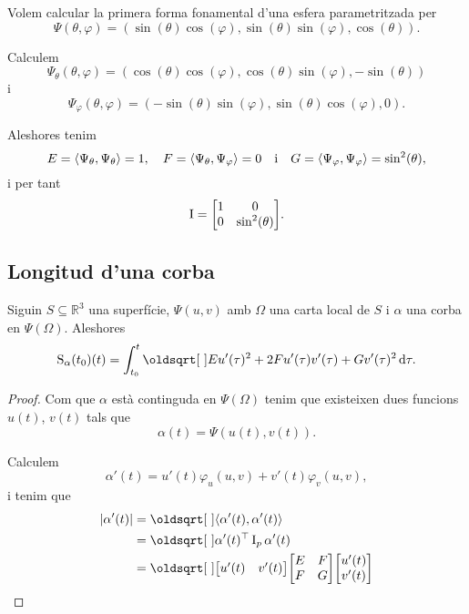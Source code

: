 \documentclass[../Apunts.tex]{subfiles}
\begin{document}
	\begin{example}
		\label{ex:primera forma fonamental d'una esfera de radi 1}
		Volem calcular la primera forma fonamental d'una esfera parametritzada per
		\[\Psi(\theta,\varphi)=(\sin(\theta)\cos(\varphi),\sin(\theta)\sin(\varphi),\cos(\theta)).\]
	\end{example}
	\begin{solution}
		Calculem
		\[\Psi_{\theta}(\theta,\varphi)=(\cos(\theta)\cos(\varphi),\cos(\theta)\sin(\varphi),-\sin(\theta))\]
		i
		\[\Psi_{\varphi}(\theta,\varphi)=(-\sin(\theta)\sin(\varphi),\sin(\theta)\cos(\varphi),0).\]
		
		Aleshores tenim
		\[E=\prodesc{\Psi_{\theta}}{\Psi_{\theta}}=1,\quad F=\prodesc{\Psi_{\theta}}{\Psi_{\varphi}}=0\quad\text{i}\quad G=\prodesc{\Psi_{\varphi}}{\Psi_{\varphi}}=\sin^{2}(\theta),\]
		i per tant
		\[\I=\begin{bmatrix}
			1 & 0 \\
			0 & \sin^{2}(\theta)
		\end{bmatrix}.\qedhere\]
	\end{solution}
	\subsection{Longitud d'una corba}
	\begin{proposition}
		\label{prop:longitud d'una corba en una superfície}
		Siguin \(S\subseteq\mathbb{R}^{3}\) una superfície, \(\Psi(u,v)\) amb \(\Omega\) una carta local de \(S\) i \(\alpha\) una corba en \(\Psi(\Omega)\). Aleshores
		\[\funciolongituddarc_{\alpha}(t_{0})(t)=\int_{t_{0}}^{t}\sqrt{Eu'(\tau)^{2}+2Fu'(\tau)v'(\tau)+Gv'(\tau)^{2}}\diff \tau.\]
	\end{proposition}
	\begin{proof}
		Com que \(\alpha\) està continguda en \(\Psi(\Omega)\) tenim que existeixen dues funcions \(u(t)\), \(v(t)\) tals que
		\[\alpha(t)=\Psi(u(t),v(t)).\]
		
		Calculem
		\[\alpha'(t)=u'(t)\varphi_{u}(u,v)+v'(t)\varphi_{v}(u,v),\]
		i tenim que
		\begin{align*}
			\norm{\alpha'(t)}&=\sqrt{\prodesc{\alpha'(t)}{\alpha'(t)}} \\
			&=\sqrt{\alpha'(t)^{\transposta}\I_{p}\alpha'(t)} \\
			&=\sqrt{\begin{bmatrix}
				u'(t) & v'(t)
			\end{bmatrix}
			\begin{bmatrix}
				E & F \\
				F & G
			\end{bmatrix}
			\begin{bmatrix}
				u'(t) \\
				v'(t)
			\end{bmatrix}}
		\end{align*}
	\end{proof}
	
\end{document}
